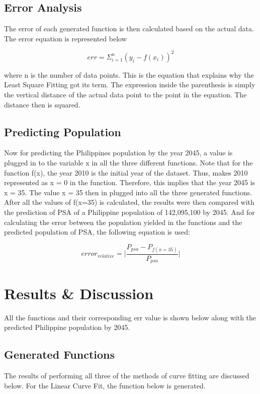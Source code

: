 \documentclass{acm_proc_article-sp}
\begin{document}
\subsection{Error Analysis}
The error of each generated function is then calculated based on the actual data. The error equation is represented below

\begin{equation}
err = \Sigma_{i=1}^n(y_i - f(x_i))^2
\end{equation}

where n is the number of data points. This is the equation that explains why the Least Square Fitting got its term. The expression inside the parenthesis is simply the vertical distance of the actual data point to the point in the equation. The distance then is squared.

\subsection{Predicting Population}
Now for predicting the Philippines population by the year 2045, a value is plugged in to the variable x in all the three different functions. Note that for the function f(x), the year 2010 is the initial year of the dataset. Thus, makes 2010 represented as x = 0 in the function. Therefore, this implies that the year 2045 is x = 35. The value x = 35 then in plugged into all the three generated functions. After all the values of f(x=35) is calculated, the results were then compared with the prediction of PSA of a Philippine population of 142,095,100 by 2045. And for calculating the error between the population yielded in the functions and the predicted population of PSA, the following equation is used:

\begin{equation}
error_{relative} = \lvert\frac{ P_{psa} - P_{f(x=35)}}{P_{psa}}\rvert
\end{equation}

\section{Results \& Discussion}
All the functions and their corresponding err value is shown below along with the predicted Philippine population by 2045.

\subsection{Generated Functions}
The results of performing all three of the methods of curve fitting are discussed below. For the Linear Curve Fit, the function below is generated.
\end{document}
